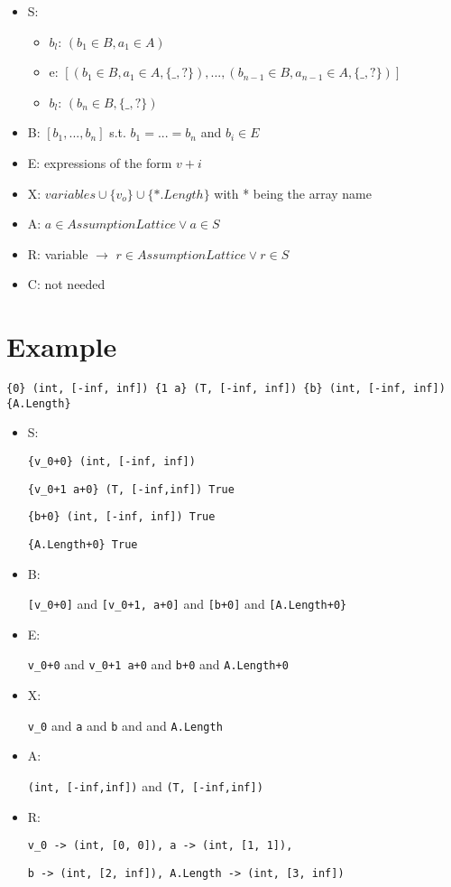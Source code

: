 \documentclass[11pt]{article}
\begin{document}
\begin{itemize}
  \item S:
  \begin{itemize}
    \item $b_l$: $(b_1\in B, a_1\in A)$
    \item e: $[(b_1\in B, a_1\in A, \{\_, ?\}), ..., (b_{n-1}\in B, a_{n-1}\in A, \{\_, ?\})]$
    \item $b_l$: $(b_n\in B, \{\_, ?\})$
  \end{itemize}
  \item B: $[b_1, ..., b_n]$ s.t. $b_1 = ... = b_n$ and $b_i \in E$
  \item E: expressions of the form $v + i$
  \item X: $variables \cup \{v_o\} \cup \{*.Length\}$ with * being the array name
  \item A: $a\in AssumptionLattice \vee a\in S$
  \item R: variable $\rightarrow$ $r\in AssumptionLattice \vee r \in S$
  \item C: not needed
\end{itemize}

\section{Example}

\verb|{0} (int, [-inf, inf]) {1 a} (T, [-inf, inf]) {b} (int, [-inf, inf]) {A.Length}|

\begin{itemize}
\item S: 

\verb|{v_0+0} (int, [-inf, inf])|

\verb|{v_0+1 a+0} (T, [-inf,inf]) True|

\verb|{b+0} (int, [-inf, inf]) True|

\verb|{A.Length+0} True|
\item B: 

\verb|[v_0+0]| and \verb|[v_0+1, a+0]| and \verb|[b+0]| and \verb|[A.Length+0}|
\item E: 

\verb|v_0+0| and \verb|v_0+1 a+0| and \verb|b+0| and \verb|A.Length+0|
\item X:

\verb|v_0| and \verb|a| and \verb|b| and  and \verb|A.Length|
\item A: 

\verb|(int, [-inf,inf])| and \verb|(T, [-inf,inf])|
\item R: 

\verb|v_0 -> (int, [0, 0]), a -> (int, [1, 1]),|

\verb|b -> (int, [2, inf]), A.Length -> (int, [3, inf])|
\end{itemize}
\end{document}
